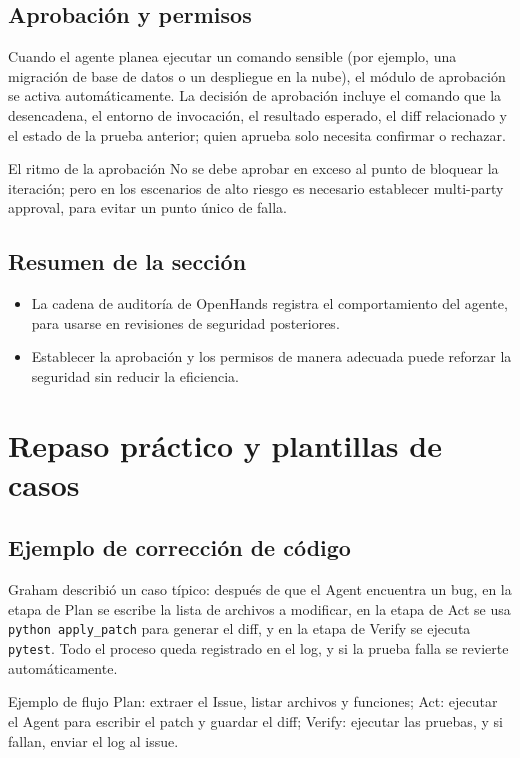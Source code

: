 \documentclass[a4paper]{article}
\begin{document}
\subsection{Aprobación y permisos}
Cuando el agente planea ejecutar un comando sensible (por ejemplo, una migración de base de datos o un despliegue en la nube), el módulo de aprobación se activa automáticamente. La decisión de aprobación incluye el comando que la desencadena, el entorno de invocación, el resultado esperado, el diff relacionado y el estado de la prueba anterior; quien aprueba solo necesita confirmar o rechazar.

\begin{warningbox}{El ritmo de la aprobación}
No se debe aprobar en exceso al punto de bloquear la iteración; pero en los escenarios de alto riesgo es necesario establecer multi-party approval, para evitar un punto único de falla.
\end{warningbox}

\subsection{Resumen de la sección}
\begin{itemize}
    \item La cadena de auditoría de OpenHands registra el comportamiento del agente, para usarse en revisiones de seguridad posteriores.
    \item Establecer la aprobación y los permisos de manera adecuada puede reforzar la seguridad sin reducir la eficiencia.
\end{itemize}
\section{Repaso práctico y plantillas de casos}
\subsection{Ejemplo de corrección de código}
Graham describió un caso típico: después de que el Agent encuentra un bug, en la etapa de Plan se escribe la lista de archivos a modificar, en la etapa de Act se usa \texttt{python apply\_patch} para generar el diff, y en la etapa de Verify se ejecuta \texttt{pytest}. Todo el proceso queda registrado en el log, y si la prueba falla se revierte automáticamente.

\begin{knowledgebox}{Ejemplo de flujo}
Plan: extraer el Issue, listar archivos y funciones; Act: ejecutar el Agent para escribir el patch y guardar el diff; Verify: ejecutar las pruebas, y si fallan, enviar el log al issue.
\end{knowledgebox}
\end{document}
